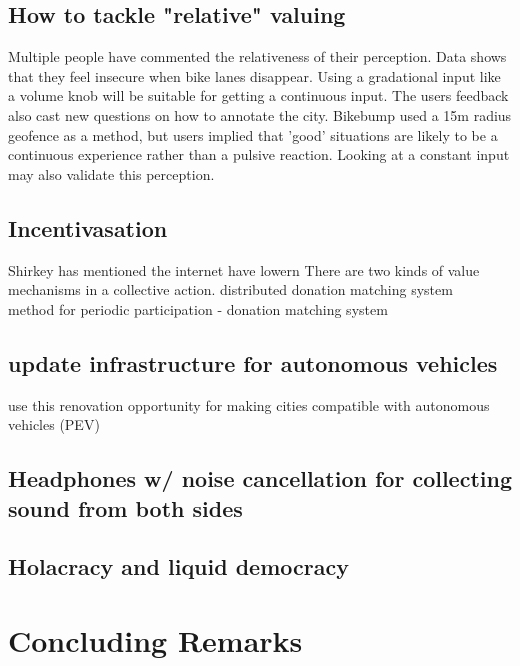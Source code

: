 \subsection{How to tackle "relative" valuing}
Multiple people have commented the relativeness of their perception. Data shows that they feel insecure when bike lanes disappear. Using a gradational input like a volume knob will be suitable for getting a continuous input. The users feedback also cast new questions on how to annotate the city. Bikebump used a 15m radius geofence as a method, but users implied that 'good' situations are likely to be a continuous experience rather than a pulsive reaction. Looking at a constant input may also validate this perception.


\subsection{Incentivasation}
Shirkey has mentioned the internet have lowern There are two kinds of value mechanisms in a collective action. \cite{shirky2010cognitive}
distributed donation matching system \\
method for periodic participation - donation matching system \\
\subsection {update infrastructure for autonomous vehicles}
use this renovation opportunity for making cities compatible with autonomous vehicles (PEV)
\subsection{Headphones w/ noise cancellation for collecting sound from both
sides}
\subsection{Holacracy and liquid democracy}

\section{Concluding Remarks}
\cite{rudofsky1964architecture}


 